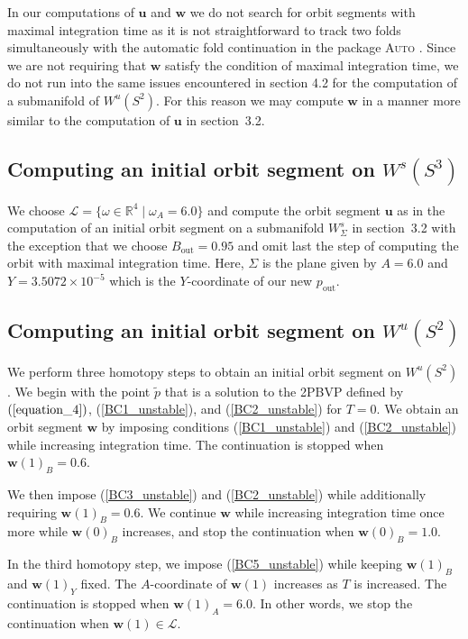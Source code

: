 \documentclass{ws-ijbc}
\begin{document}
In our computations of $\mathbf{u}$ and $\mathbf{w}$ we do not search for orbit segments with maximal integration time as it is not straightforward to track two folds simultaneously with the automatic fold continuation in the package \textsc{Auto} \cite{AUTO}.  Since we are not requiring that $\mathbf{w}$ satisfy the condition of maximal integration time, we do not run into the same issues encountered in section 4.2 for the computation of a submanifold of $W^u(S^2)$.  For this reason we may compute $\mathbf{w}$ in a manner more similar to the computation of $\mathbf{u}$ in section~3.2.

\subsection{Computing an initial orbit segment on $W^s(S^3)$}

We choose $\mathscr{L} = \{\omega \in \mathbb{R}^4 \; | \; \omega_A = 6.0 \}$ and compute the orbit segment $\mathbf{u}$ as in the computation of an initial orbit segment on a submanifold $W^s_{\Sigma}$ in section~3.2 with the exception that we choose $B_{\text{out}}=0.95$ and omit last the step of computing the orbit with maximal integration time.  Here, $\Sigma$ is the plane given by $A=6.0$ and $Y=3.5072 \times 10^{-5}$ which is the $Y$-coordinate of our new $p_{\text{out}}$.

\subsection{Computing an initial orbit segment on $W^u(S^2)$}

We perform three homotopy steps to obtain an initial orbit segment on $W^u(S^2)$.  We begin with the point $\tilde{p}$ that is a solution to the 2PBVP defined by $(\ref{equation_4})$, (\ref{BC1_unstable}), and (\ref{BC2_unstable}) for $T=0$.  We obtain an orbit segment $\mathbf{w}$ by imposing conditions (\ref{BC1_unstable}) and (\ref{BC2_unstable}) while increasing integration time.  The continuation is stopped when $\mathbf{w}(1)_B = 0.6$.

We then impose (\ref{BC3_unstable}) and (\ref{BC2_unstable}) while additionally requiring $\mathbf{w}(1)_B=0.6$.  We continue $\mathbf{w}$ while increasing integration time once more while $\mathbf{w}(0)_B$ increases, and stop the continuation when $\mathbf{w}(0)_B=1.0$.

In the third homotopy step, we impose (\ref{BC5_unstable}) while keeping $\mathbf{w}(1)_B$ and $\mathbf{w}(1)_Y$ fixed.  The $A$-coordinate of $\mathbf{w}(1)$ increases as $T$ is increased.  The continuation is stopped when $\mathbf{w}(1)_A = 6.0$.  In other words, we stop the continuation when $\mathbf{w}(1) \in \mathscr{L}$.
\end{document}
